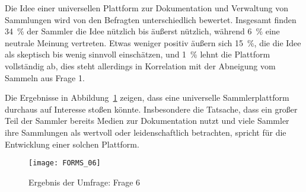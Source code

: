Die Idee einer universellen Plattform zur Dokumentation und Verwaltung von Sammlungen wird von den Befragten unterschiedlich bewertet.
Insgesamt finden 34~\% der Sammler die Idee nützlich bis äußerst nützlich, während 6~\% eine neutrale Meinung vertreten.
Etwas weniger positiv äußern sich 15~\%, die die Idee als skeptisch bis wenig sinnvoll einschätzen, und 1~\% lehnt die Plattform vollständig ab, dies steht allerdings in Korrelation mit der Abneigung vom Sammeln aus Frage 1.

Die Ergebnisse in Abbildung~\ref{fig:forms_result_06} zeigen, dass eine universelle Sammlerplattform durchaus auf Interesse stoßen könnte.
Insbesondere die Tatsache, dass ein großer Teil der Sammler bereits Medien zur Dokumentation nutzt und viele Sammler ihre Sammlungen als wertvoll oder leidenschaftlich betrachten, spricht für die Entwicklung einer solchen Plattform.

\begin{figure}[h!]
    \centering
    \texttt{[image: FORMS\_06]}
    \caption{Ergebnis der Umfrage: Frage 6}
    \label{fig:forms_result_06}
\end{figure}

